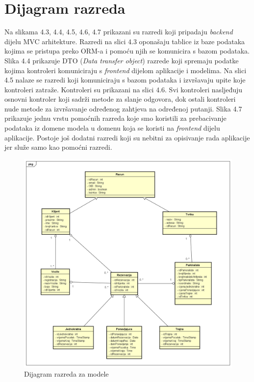 			\eject
			
			
		\section{Dijagram razreda}
		
		Na  slikama 4.3, 4.4, 4.5, 4.6, 4.7 prikazani su razredi koji pripadaju \textit{backend} dijelu MVC arhitekture. Razredi na slici 4.3 oponašaju tablice iz baze podataka kojima se pristupa preko ORM-a i pomoću njih se komunicira s bazom podataka. Slika 4.4 prikazuje DTO (\textit{Data transfer object}) razrede koji spremaju podatke kojima kontroleri komuniciraju s \textit{frontend} dijelom aplikacije i modelima. Na slici 4.5 nalaze se razredi koji komuniciraju s bazom podataka i izvršavaju upite koje kontroleri zatraže. Kontroleri su prikazani na slici 4.6. Svi kontroleri nasljeđuju osnovni kontroler koji sadrži metode za slanje odgovora, dok ostali kontroleri nude metode za izvršavanje određenog zahtjeva na određenoj putanji. Slika 4.7 prikazuje jednu vrstu pomoćnih razreda koje smo koristili za prebacivanje podataka iz domene modela u domenu koja se koristi na \textit{frontend} dijelu aplikacije. Postoje još dodatni razredi koji su nebitni za opisivanje rada aplikacije jer služe samo kao pomoćni razredi.
		
		\begin{figure}[H]
	        \includegraphics[width=1\linewidth]{dijagrami/Dijagram razreda - Modeli.png}
        	\caption{Dijagram razreda za modele}
        	\label{fig:Dijagram razreda - modeli}
        \end{figure}
    

